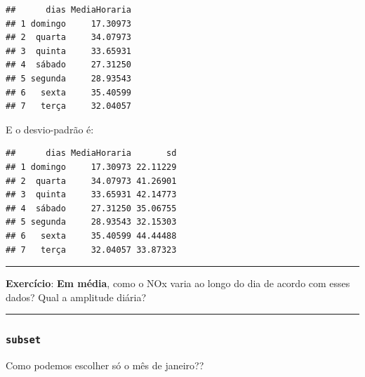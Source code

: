 \documentclass[]{book}
\newenvironment{Shaded}{\begin{snugshade}}{\end{snugshade}}
\newcommand{\KeywordTok}[1]{\textcolor[rgb]{0.13,0.29,0.53}{\textbf{#1}}}
\newcommand{\DataTypeTok}[1]{\textcolor[rgb]{0.13,0.29,0.53}{#1}}
\newcommand{\StringTok}[1]{\textcolor[rgb]{0.31,0.60,0.02}{#1}}
\newcommand{\CommentTok}[1]{\textcolor[rgb]{0.56,0.35,0.01}{\textit{#1}}}
\newcommand{\OperatorTok}[1]{\textcolor[rgb]{0.81,0.36,0.00}{\textbf{#1}}}
\newcommand{\NormalTok}[1]{#1}
\theoremstyle{definition}
\theoremstyle{definition}
\theoremstyle{definition}
\theoremstyle{remark}
\begin{document}
\begin{verbatim}
##      dias MediaHoraria
## 1 domingo     17.30973
## 2  quarta     34.07973
## 3  quinta     33.65931
## 4  sábado     27.31250
## 5 segunda     28.93543
## 6   sexta     35.40599
## 7   terça     32.04057
\end{verbatim}

E o desvio-padrão é:

\begin{Shaded}
\end{Shaded}

\begin{verbatim}
##      dias MediaHoraria       sd
## 1 domingo     17.30973 22.11229
## 2  quarta     34.07973 41.26901
## 3  quinta     33.65931 42.14773
## 4  sábado     27.31250 35.06755
## 5 segunda     28.93543 32.15303
## 6   sexta     35.40599 44.44488
## 7   terça     32.04057 33.87323
\end{verbatim}

\begin{center}\rule{0.5\linewidth}{\linethickness}\end{center}

{\textbf{Exercício}: \textbf{Em média}, como o NOx varia ao longo do dia
de acordo com esses dados? Qual a amplitude diária?}

\begin{center}\rule{0.5\linewidth}{\linethickness}\end{center}

\subsubsection{\texorpdfstring{\texttt{subset}}{subset}}\label{subset}

Como podemos escolher só o mês de janeiro??

\begin{Shaded}
\end{Shaded}
\end{document}
